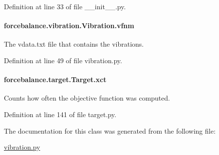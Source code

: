 Definition at line 33 of file \-\_\-\-\_\-init\-\_\-\-\_\-.\-py.

\hypertarget{classforcebalance_1_1vibration_1_1Vibration_a50552dbdadc7a86aaab97bfdcf85e449}{
\paragraph[{vfnm}]{\setlength{\rightskip}{0pt plus 5cm}forcebalance.\-vibration.\-Vibration.\-vfnm}}\label{classforcebalance_1_1vibration_1_1Vibration_a50552dbdadc7a86aaab97bfdcf85e449}


The vdata.\-txt file that contains the vibrations. 



Definition at line 49 of file vibration.\-py.

\hypertarget{classforcebalance_1_1target_1_1Target_aad2e385cfbf7b4a68f1c2cb41133fe82}{
\paragraph[{xct}]{\setlength{\rightskip}{0pt plus 5cm}forcebalance.\-target.\-Target.\-xct\hspace{0.3cm}{\ttfamily [inherited]}}}\label{classforcebalance_1_1target_1_1Target_aad2e385cfbf7b4a68f1c2cb41133fe82}


Counts how often the objective function was computed. 



Definition at line 141 of file target.\-py.



The documentation for this class was generated from the following file\-:\begin{DoxyCompactItemize}
\item 
\hyperlink{vibration_8py}{vibration.\-py}\end{DoxyCompactItemize}
